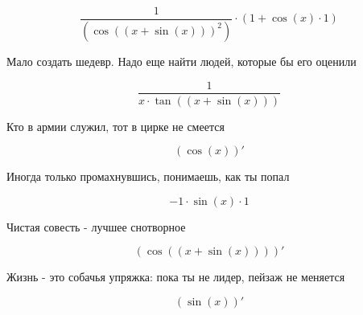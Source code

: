 \documentclass[a4paper,12pt]{article}
\begin{document}
\begin{center}
\begin{equation}
 \frac{1 }{ (\cos((x + \sin(x)))^{2}) }  \cdot (1 + \cos(x) \cdot 1)
\end{equation}
\end{center}

\begin{center}
Мало создать шедевр. Надо еще найти людей, которые бы его оценили
\end{center}

\begin{center}
\begin{equation}
 \frac{1 }{ x \cdot \tan((x + \sin(x))) } 
\end{equation}
\end{center}

\begin{center}
Кто в армии служил, тот в цирке не смеется
\end{center}

\begin{center}
\begin{equation}
(\cos(x))'
\end{equation}
\end{center}

\begin{center}
Иногда только промахнувшись, понимаешь, как ты попал
\end{center}

\begin{center}
\begin{equation}
-1 \cdot \sin(x) \cdot 1
\end{equation}
\end{center}

\begin{center}
Чистая совесть - лучшее снотворное
\end{center}

\begin{center}
\begin{equation}
(\cos((x + \sin(x))))'
\end{equation}
\end{center}

\begin{center}
Жизнь - это собачья упряжка: пока ты не лидер, пейзаж не меняется
\end{center}

\begin{center}
\begin{equation}
(\sin(x))'
\end{equation}
\end{center}
\end{document}
